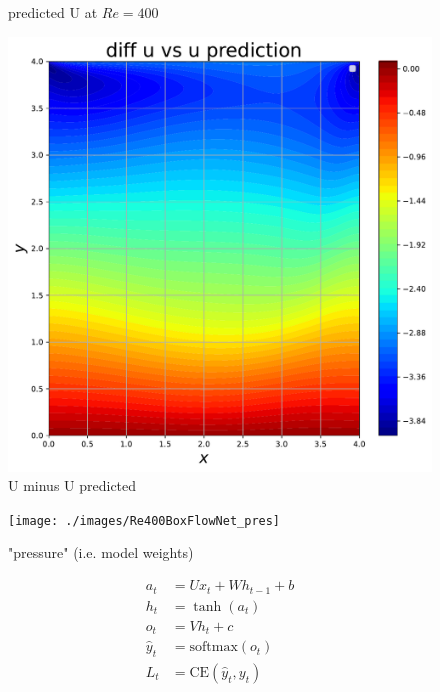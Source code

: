 \documentclass{article}
\begin{document}
\begin{figure}[htb!]
		\caption{predicted U at $Re = 400$}
\label{fig:u_pred}
		\endminipage\hfill
		\includegraphics[width=\linewidth]{./images/Re400BoxFlowNet_diff_u}
		\caption{U minus U predicted}
		\label{fig:u_diff}\hfill
		
		\endminipage
	\end{figure}

	\begin{figure}[htb!]
		\centering
		\texttt{[image: ./images/Re400BoxFlowNet\_pres]}
		\caption{"pressure" (i.e. model weights)}\label{fig:pred_pres}
		\label{fig:SIMPLE_pres2}
	\end{figure}
	
	\begin{equation}
	\begin{aligned}
		a_t &= Ux_t + W h_{t-1} + b \\
		h_t &= \tanh(a_t) \\
		o_t &= Vh_t + c \\
		\hat{y}_t &= \text{softmax}(o_t) \\
		L_t &= \text{CE}(\hat{y}_t, y_t)
	\end{aligned}
	\end{equation}
	
\end{document}
